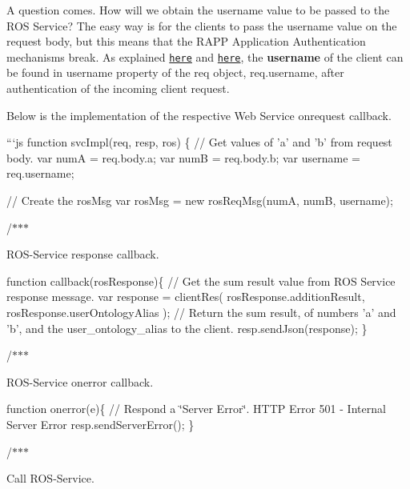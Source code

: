 A question comes. How will we obtain the {\ttfamily username} value to be passed to the R\-O\-S Service? The easy way is for the clients to pass the {\ttfamily username} value on the request body, but this means that the R\-A\-P\-P Application Authentication mechanisms break. As explained \href{https://github.com/rapp-project/rapp-platform/wiki/RAPP-Application-Authentication}{\tt here} and \href{https://github.com/rapp-project/rapp-platform/wiki/How-to-create-a-HOP-service-for-a-ROS-service%3F#rapp-web-services-framework}{\tt here}, the {\bfseries username} of the client can be found in {\ttfamily username} property of the {\ttfamily req} object, {\ttfamily req.\-username}, after authentication of the incoming client request.

Below is the implementation of the respective Web Service onrequest callback.

```js function svc\-Impl(req, resp, ros) \{ // Get values of 'a' and 'b' from request body. var num\-A = req.\-body.\-a; var num\-B = req.\-body.\-b; var username = req.\-username;

// Create the ros\-Msg var ros\-Msg = new ros\-Req\-Msg(num\-A, num\-B, username);

/$\ast$$\ast$$\ast$
\begin{DoxyItemize}
\item R\-O\-S-\/\-Service response callback.
\end{DoxyItemize}

function callback(ros\-Response)\{ // Get the sum result value from R\-O\-S Service response message. var response = client\-Res( ros\-Response.\-addition\-Result, ros\-Response.\-user\-Ontology\-Alias ); // Return the sum result, of numbers 'a' and 'b', and the {\ttfamily user\-\_\-ontology\-\_\-alias} to the client. resp.\-send\-Json(response); \}

/$\ast$$\ast$$\ast$
\begin{DoxyItemize}
\item R\-O\-S-\/\-Service onerror callback.
\end{DoxyItemize}

function onerror(e)\{ // Respond a \char`\"{}\-Server Error\char`\"{}. H\-T\-T\-P Error 501 -\/ Internal Server Error resp.\-send\-Server\-Error(); \}

/$\ast$$\ast$$\ast$
\begin{DoxyItemize}
\item Call R\-O\-S-\/\-Service.
\end{DoxyItemize}

